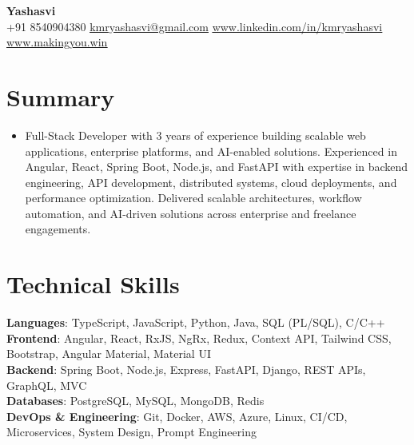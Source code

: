 \documentclass[letterpaper,11pt]{article}
\newcommand{\resumeItem}[1]{\item\small{{#1 \vspace{-2pt}}}}
\newcommand{\resumeSubHeadingListStart}{\begin{itemize}[leftmargin=0.0in, label={}]}
\newcommand{\resumeSubHeadingListEnd}{\end{itemize}}
\begin{document}
\begin{center}
    {\Huge\bfseries Yashasvi} \\ \vspace{1pt}
    \small
    +91 8540904380 \hspace{0.5em}\textbar \hspace{0.5em}
    \href{mailto:kmryashasvi@gmail.com}{\underline{kmryashasvi@gmail.com}}
    \hspace{0.5em}\textbar\hspace{0.5em}
    \href{https://linkedin.com/in/kmryashasvi}{\underline{www.linkedin.com/in/kmryashasvi}}
    \hspace{0.5em}\textbar\hspace{0.5em}
    \href{https://makingyou.win}{\underline{www.makingyou.win}}
    \vspace{-8pt}
\end{center}

\section{Summary}
\resumeSubHeadingListStart
\resumeItem{Full-Stack Developer with 3 years of experience building scalable web applications, enterprise platforms, and AI-enabled solutions. Experienced in Angular, React, Spring Boot, Node.js, and FastAPI with expertise in backend engineering, API development, distributed systems, cloud deployments, and performance optimization. Delivered scalable architectures, workflow automation, and AI-driven solutions across enterprise and freelance engagements.}
\resumeSubHeadingListEnd
\vspace{-10pt}

\section{Technical Skills}
\begin{itemize}[leftmargin=0.15in, label={}]
\small{\item{
\textbf{Languages}{: TypeScript, JavaScript, Python, Java, SQL (PL/SQL), C/C++} \\
\textbf{Frontend}{: Angular, React, RxJS, NgRx, Redux, Context API, Tailwind CSS, Bootstrap, Angular Material, Material UI} \\
\textbf{Backend}{: Spring Boot, Node.js, Express, FastAPI, Django, REST APIs, GraphQL, MVC} \\
\textbf{Databases}{: PostgreSQL, MySQL, MongoDB, Redis} \\
\textbf{DevOps \& Engineering}{: Git, Docker, AWS, Azure, Linux, CI/CD, Microservices, System Design, Prompt Engineering} 
}}
\end{itemize}
\vspace{-12pt}
\end{document}
